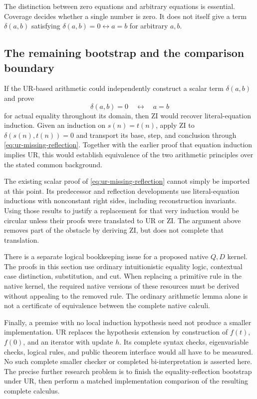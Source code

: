 The distinction between zero equations and arbitrary equations is
essential.  Coverage decides whether a single number is zero.  It
does not itself give a term $\delta(a,b)$ satisfying
$\delta(a,b)=0\leftrightarrow a=b$ for arbitrary $a,b$.

\subsection{The remaining bootstrap and the comparison boundary}

If the UR-based arithmetic could independently construct a scalar
term $\delta(a,b)$ and prove
\[
 \delta(a,b)=0\quad\longleftrightarrow\quad a=b
 \tag{EqRef}\label{eq:ur-missing-reflection}
\]
for actual equality throughout its domain, then ZI would recover
literal-equation induction.  Given an induction on $s(n)=t(n)$,
apply ZI to $\delta(s(n),t(n))=0$ and transport its base, step,
and conclusion through \eqref{eq:ur-missing-reflection}.
Together with the earlier proof that equation induction implies UR,
this would establish equivalence of the two arithmetic principles
over the stated common background.

The existing scalar proof of \eqref{eq:ur-missing-reflection}
cannot simply be imported at this point.  Its predecessor and
reflection developments use literal-equation inductions with
nonconstant right sides, including reconstruction invariants.
Using those results to justify a replacement for that very induction
would be circular unless their proofs were translated to UR or ZI.
The argument above removes part of the obstacle by deriving ZI, but
does not complete that translation.

There is a separate logical bookkeeping issue for a proposed native
$Q,D$ kernel.  The proofs in this section use ordinary intuitionistic
equality logic, contextual case distinction, substitution, and cut.
When replacing a primitive rule in the native kernel, the required
native versions of these resources must be derived without appealing
to the removed rule.  The ordinary arithmetic lemma alone is not a
certificate of equivalence between the complete native calculi.

Finally, a premise with no local induction hypothesis need not produce
a smaller implementation.  UR replaces the hypothesis extension by
construction of $f(t)$, $f(0)$, and an iterator with update $h$.
Its complete syntax checks, eigenvariable checks, logical rules, and
public theorem interface would all have to be measured.  No such
complete smaller checker or completed bi-interpretation is asserted
here.  The precise further research problem is to finish the
equality-reflection bootstrap under UR, then perform a matched
implementation comparison of the resulting complete calculus.
